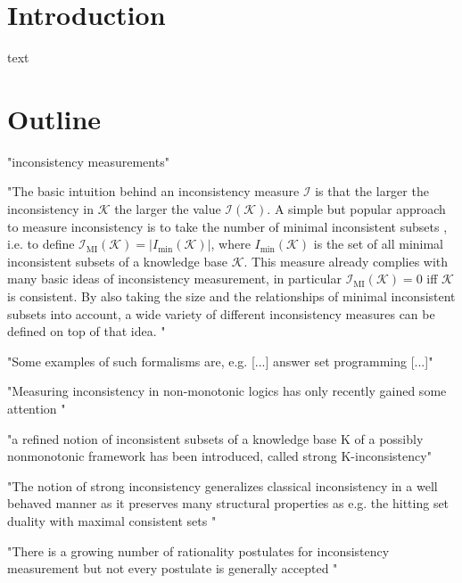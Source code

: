 \section{Introduction}
text

\section{Outline}

"inconsistency measurements"
\cite{bertossi_approaches_2005} \cite{grant_measuring_2006}

"The basic intuition behind an inconsistency measure \(\mathcal{I}\) is that the larger the inconsistency in \(\mathcal{K}\) the larger the value \(\mathcal{I}(\mathcal{K})\). A simple but popular approach to measure inconsistency is to take the number of minimal inconsistent subsets \cite{hunter_measuring_2008}, i.e. to define \(\mathcal{I}_{\text{MI}}(\mathcal{K}) = \left| I_{\min}(\mathcal{K}) \right|\), where \(I_{\min}(\mathcal{K})\) is the set of all minimal inconsistent subsets of a knowledge base \(\mathcal{K}\). This measure already complies with many basic ideas of inconsistency measurement, in particular \(\mathcal{I}_{\text{MI}}(\mathcal{K})=0\) iff \(\mathcal{K}\) is consistent. By also taking the size and the relationships of minimal inconsistent subsets into account, a wide variety of different inconsistency measures can be defined on top of that idea. \cite{hunter_measuring_2008} \cite{jabbour_mis_2016}"

"Some examples of such formalisms are, e.g. [...] answer set programming \cite{gelfond_logic_2002} [...]"

"Measuring inconsistency in non-monotonic logics has only recently gained some attention \cite{ulbricht_measuring_2018} \cite{brewka_strong_2019} \cite{michael_measuring_2016} \cite{brewka_strong_2017}"

"a refined notion of inconsistent subsets of a knowledge base K of a possibly nonmonotonic framework has been introduced, called strong K-inconsistency"
\cite{brewka_strong_2017}

"The notion of strong inconsistency generalizes classical inconsistency in a well behaved manner as it preserves many structural properties as e.g. the hitting set duality with maximal consistent sets \cite{reiter_theory_1987}"

"There is a growing number of rationality postulates for inconsistency measurement but not every postulate is generally accepted \cite{hameurlain_basic_2017} \cite{ferme_revisiting_2014}"

